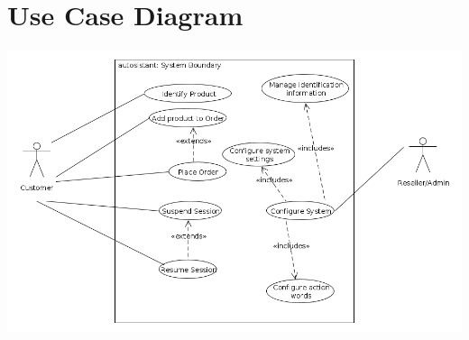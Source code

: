 \documentclass[11pt, titlepage]{article}
\author{Graeme Douglas (76316090)}
\begin{document}
\section{Use Case Diagram}
\includegraphics[scale=0.4]{project_usecasediagram.png}
\end{document}
